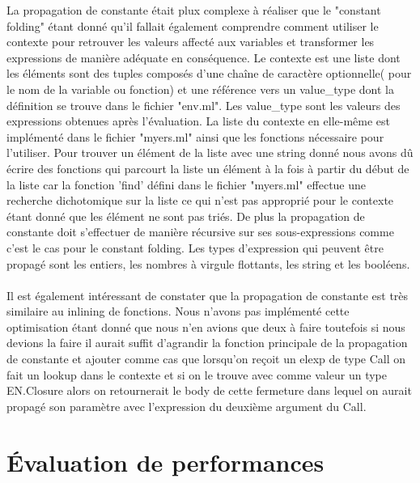 \documentclass{article}
\begin{document}
La propagation de constante était plux complexe à réaliser que le "constant
folding" étant donné qu'il fallait également comprendre comment utiliser le 
contexte pour retrouver les valeurs affecté aux variables et transformer les
expressions de manière adéquate en conséquence. Le contexte est une liste dont
les éléments sont des tuples composés d'une chaîne de caractère optionnelle(
pour le nom de la variable ou fonction) et une référence vers un value\_type
dont la définition se trouve dans le fichier "env.ml". Les value\_type sont
les valeurs des expressions obtenues après l'évaluation. La liste du contexte
en elle-même est implémenté dans le fichier "myers.ml" ainsi que les fonctions
nécessaire pour l'utiliser. Pour trouver un élément de la liste avec une
string donné nous avons dû écrire des fonctions qui parcourt la liste un 
élément à la fois à partir du début de la liste car la fonction 'find' défini
dans le fichier "myers.ml" effectue une recherche dichotomique sur la liste ce
qui n'est pas approprié pour le contexte étant donné que les élément ne sont
pas triés. De plus la propagation de constante doit s'effectuer de manière 
récursive sur ses sous-expressions comme c'est le cas pour le constant folding.
Les types d'expression qui peuvent être propagé sont les entiers, les nombres
à virgule flottants, les string et les booléens.

\paragraph{}
Il est également intéressant de constater que la propagation de constante est
très similaire au inlining de fonctions. Nous n'avons pas implémenté cette
optimisation étant donné que nous n'en avions que deux à faire toutefois si
nous devions la faire il aurait suffit d'agrandir la fonction principale de
la propagation de constante et ajouter comme cas que lorsqu'on reçoit un elexp
de type Call on fait un lookup dans le contexte et si on le trouve avec comme
valeur un type EN.Closure alors on retournerait le body de cette fermeture dans
lequel on aurait propagé son paramètre avec l'expression du deuxième argument
du Call.

\section{Évaluation de performances}
\end{document}
